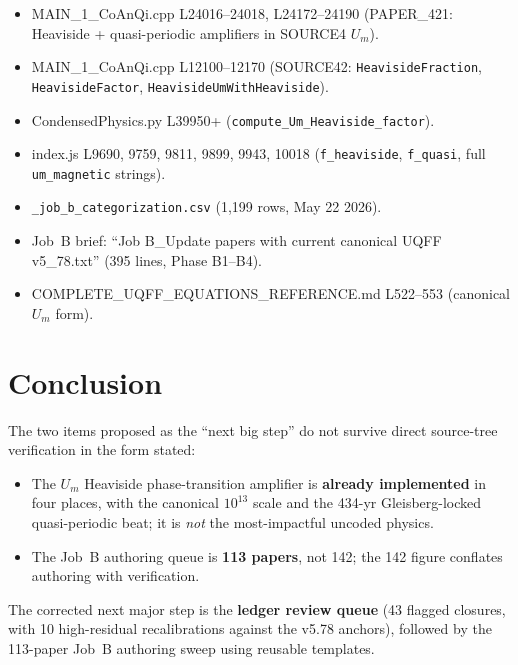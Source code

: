 \documentclass[11pt]{article}
\begin{document}
\begin{itemize}
\item MAIN\_1\_CoAnQi.cpp L24016--24018, L24172--24190
      (PAPER\_421: Heaviside + quasi-periodic amplifiers in SOURCE4 $U_m$).
\item MAIN\_1\_CoAnQi.cpp L12100--12170 (SOURCE42: \verb|HeavisideFraction|,
      \verb|HeavisideFactor|, \verb|HeavisideUmWithHeaviside|).
\item CondensedPhysics.py L39950+ (\verb|compute_Um_Heaviside_factor|).
\item index.js L9690, 9759, 9811, 9899, 9943, 10018
      (\verb|f_heaviside|, \verb|f_quasi|, full \verb|um_magnetic| strings).
\item \verb|_job_b_categorization.csv| (1,199 rows, May 22 2026).
\item Job~B brief: ``Job B\_Update papers with current canonical UQFF v5\_78.txt''
      (395 lines, Phase B1--B4).
\item COMPLETE\_UQFF\_EQUATIONS\_REFERENCE.md L522--553 (canonical $U_m$ form).
\end{itemize}

\section{Conclusion}

The two items proposed as the ``next big step'' do not survive
direct source-tree verification in the form stated:

\begin{itemize}
\item The $U_m$ Heaviside phase-transition amplifier is
      \textbf{already implemented} in four places, with the
      canonical $10^{13}$ scale and the 434-yr Gleisberg-locked
      quasi-periodic beat; it is \emph{not} the most-impactful
      uncoded physics.
\item The Job~B authoring queue is \textbf{113 papers}, not 142;
      the 142 figure conflates authoring with verification.
\end{itemize}

The corrected next major step is the \textbf{ledger review queue}
(43 flagged closures, with 10 high-residual recalibrations
against the v5.78 anchors), followed by the 113-paper Job~B
authoring sweep using reusable templates.
\end{document}
